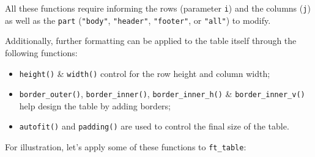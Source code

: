 \documentclass[
]{krantz}
\providecommand{\tightlist}{%
  \setlength{\itemsep}{0pt}\setlength{\parskip}{0pt}}
\begin{document}
All these functions require informing the rows (parameter \texttt{i}) and the columns (\texttt{j}) as well as the \texttt{part} (\texttt{"body"}, \texttt{"header"}, \texttt{"footer"}, or \texttt{"all"}) to modify.

Additionally, further formatting can be applied to the table itself through the following functions:

\begin{itemize}
\tightlist
\item
  \texttt{height()} \& \texttt{width()} control for the row height and column width;
\item
  \texttt{border\_outer()}, \texttt{border\_inner()}, \texttt{border\_inner\_h()} \& \texttt{border\_inner\_v()} help design the table by adding borders;
\item
  \texttt{autofit()} and \texttt{padding()} are used to control the final size of the table.
\end{itemize}

For illustration, let's apply some of these functions to \texttt{ft\_table}:
\end{document}
